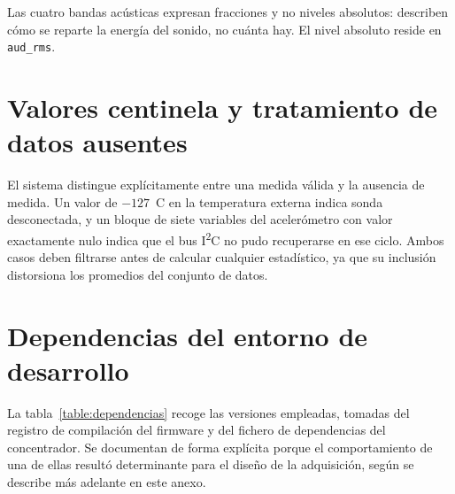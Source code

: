 Las cuatro bandas acústicas expresan fracciones y no niveles absolutos: describen cómo se
reparte la energía del sonido, no cuánta hay. El nivel absoluto reside en \texttt{aud\_rms}.

\section{Valores centinela y tratamiento de datos ausentes}

El sistema distingue explícitamente entre una medida válida y la ausencia de medida. Un
valor de \mbox{$-127$ \textdegree C} en la temperatura externa indica sonda desconectada, y
un bloque de siete variables del acelerómetro con valor exactamente nulo indica que el bus
I\textsuperscript{2}C no pudo recuperarse en ese ciclo. Ambos casos deben filtrarse antes
de calcular cualquier estadístico, ya que su inclusión distorsiona los promedios del
conjunto de datos.

\section{Dependencias del entorno de desarrollo}

La tabla~\ref{table:dependencias} recoge las versiones empleadas, tomadas del registro de
compilación del firmware y del fichero de dependencias del concentrador. Se documentan de
forma explícita porque el comportamiento de una de ellas resultó determinante para el diseño
de la adquisición, según se describe más adelante en este anexo.

